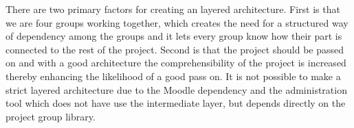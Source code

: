 There are two primary factors for creating an layered architecture. First is that we are four groups working together, which creates the need for a structured way of dependency among the groups and it lets every group know how their part is connected to the rest of the project. 
Second is that the project should be passed on and with a good architecture the comprehensibility of the project is increased thereby enhancing the likelihood of a good pass on.
It is not possible to make a strict layered architecture due to the Moodle dependency and the administration tool which does not have use the intermediate layer, but depends directly on the project group library.














